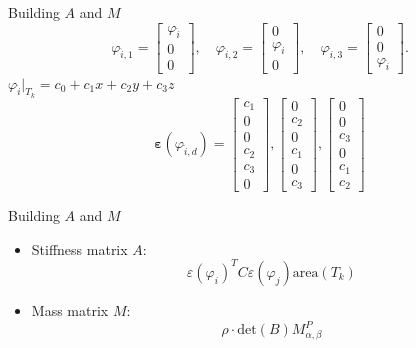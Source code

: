 \documentclass{beamer}[10pt]
\begin{document}
\begin{frame}{Building $A$ and $M$}
\centering
\begin{equation*}
\varphi_{\hat{i},1} = \begin{bmatrix}
\varphi_{\hat{i}} \\ 0 \\ 0
\end{bmatrix}, \quad
\varphi_{\hat{i},2} = \begin{bmatrix}
 0 \\ \varphi_{\hat{i}}\\ 0
\end{bmatrix}, \quad
\varphi_{\hat{i},3} = \begin{bmatrix}
0 \\ 0 \\ \varphi_{\hat{i}}
\end{bmatrix}.
\end{equation*}
$\varphi_{\hat{i}}\big|_{T_k} = c_0 + c_1x+c_2y + c_3z$
\begin{equation*}
\boldsymbol{\varepsilon}\left(\varphi_{\hat{i},d}\right) = \begin{bmatrix}
c_1 \\ 0 \\ 0 \\ c_2 \\c_3 \\ 0
\end{bmatrix}
, \begin{bmatrix}
0 \\ c_2 \\ 0 \\ c_1 \\ 0 \\ c_3 \end{bmatrix},
\begin{bmatrix}
0 \\ 0 \\ c_3 \\ 0 \\ c_1 \\ c_2 \end{bmatrix}
\end{equation*}
\end{frame}
\begin{frame}{Building $A$ and $M$}
\begin{itemize}
\item {
Stiffness matrix $A$:
\begin{equation*}
    \varepsilon\left( \varphi_i \right)^T C\varepsilon\left( \varphi_j \right) \mathrm{area}(T_k)
\end{equation*}}
\item {
Mass matrix $M$:
\begin{equation*}
 \rho\cdot \text{det}(B)M^P_{\alpha,\beta}
\end{equation*}
}
\end{itemize}
\end{frame}
\end{document}
